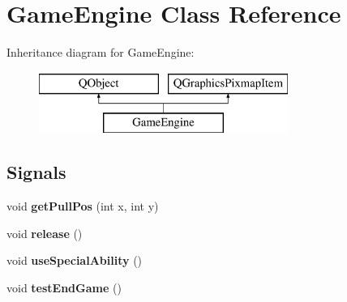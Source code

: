 \hypertarget{classGameEngine}{}\section{Game\+Engine Class Reference}
\label{classGameEngine}
Inheritance diagram for Game\+Engine\+:\begin{figure}[H]
\begin{center}
\leavevmode
\includegraphics[height=2.000000cm]{classGameEngine}
\end{center}
\end{figure}
\subsection*{Signals}
\begin{DoxyCompactItemize}
\item 
void {\bfseries get\+Pull\+Pos} (int x, int y)\hypertarget{classGameEngine_a9c6f4ac73824ddc6b9ee9cbf0d3b8a42}{}\label{classGameEngine_a9c6f4ac73824ddc6b9ee9cbf0d3b8a42}

\item 
void {\bfseries release} ()\hypertarget{classGameEngine_aa4a838423f8055843a320b705ec80f59}{}\label{classGameEngine_aa4a838423f8055843a320b705ec80f59}

\item 
void {\bfseries use\+Special\+Ability} ()\hypertarget{classGameEngine_af35a3c4db56354360b88983d65b0c569}{}\label{classGameEngine_af35a3c4db56354360b88983d65b0c569}

\item 
void {\bfseries test\+End\+Game} ()\hypertarget{classGameEngine_a9072e3043080764b6ec831b598e42849}{}\label{classGameEngine_a9072e3043080764b6ec831b598e42849}

\end{DoxyCompactItemize}
